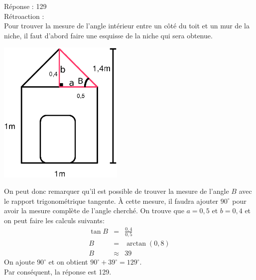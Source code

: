 \documentclass[letterpaper, 12pt]{article}
\begin{document}
R\'eponse : 129\\

R\'etroaction :\\
Pour trouver la mesure de l'angle int\'erieur entre un c\^ot\'e du toit et un mur de la niche, il faut d'abord faire une esquisse de la niche qui sera obtenue.\\
\begin{center}
 \includegraphics[width=6cm,bb=14 14 414 447]{Niche2296mesures.eps}
\end{center}
On peut donc remarquer qu'il est possible de trouver la mesure de l'angle $B$ avec le rapport trigonom\'etrique tangente. \`A cette mesure, il faudra ajouter $90^{\circ}$ pour avoir la mesure compl\`ete de l'angle cherch\'e. On trouve que $a=0,5$ et $b=0,4$ et on peut faire les calculs suivants:
\begin{eqnarray*}
\tan{B}&=&\frac{0,4}{0,5}\\[2mm]
B&=&\arctan{(0,8)}\\[2mm]
B&\approx&39
\end{eqnarray*}
On ajoute $90^{\circ}$ et on obtient $90^{\circ}+39^{\circ}=129^{\circ}$.\\
Par cons\'equent, la r\'eponse est 129.\\
\end{document}
